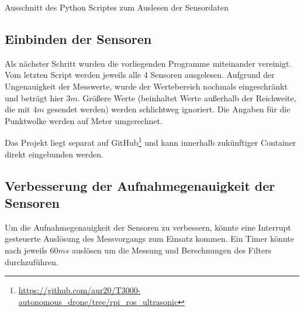 \begin{listing}[!ht]
    \caption{Ausschnitt des Python Scriptes zum Auslesen der Sensordaten}
    \label{listing:ultra_rpi_impl_i2c}
\end{listing}

\subsection{Einbinden der Sensoren}
Als nächster Schritt wurden die vorliegenden Programme miteinander vereinigt.
Vom letzten Script werden jeweils alle 4 Sensoren ausgelesen. Aufgrund der Ungenauigkeit der Messwerte, wurde der Wertebereich nochmals eingeschränkt und beträgt hier $3m$. Größere Werte (beinhaltet Werte außerhalb der Reichweite, die mit $4m$ gesendet werden) werden schlichtweg ignoriert. Die Angaben für die Punktwolke werden auf Meter umgerechnet.

Das Projekt liegt separat auf GitHub\footnote{\url{https://github.com/aur20/T3000-autonomous_drone/tree/rpi_ros_ultrasonic}} und kann innerhalb zukünftiger Container direkt eingebunden werden.

\subsection{Verbesserung der Aufnahmegenauigkeit der Sensoren}
Um die Aufnahmegenauigkeit der Sensoren zu verbessern, könnte eine Interrupt gesteuerte Auslösung des Messvorgangs zum Einsatz kommen. Ein Timer könnte nach jeweils $60ms$ auslösen um die Messung und Berechnungen des Filters durchzuführen.

